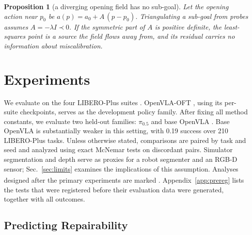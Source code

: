\documentclass{article}
\newtheorem{proposition}{Proposition}
\newcommand{\ph}{\textsuperscript{\dag}}
\begin{document}
\begin{proposition}[a diverging opening field has no sub-goal]
\label{prop:div}
Let the opening action near $p_0$ be $a(p) = a_0 + A\,(p - p_0)$. Triangulating a sub-goal from probes assumes
$A = -\lambda I \prec 0$. If the symmetric part of $A$ is positive definite, the least-squares point is a source the
field flows away from, and its residual carries no information about miscalibration.
\end{proposition}

\section{Experiments}

We evaluate on the four LIBERO-Plus suites \citep{liberoplus}. OpenVLA-OFT \citep{oft}, using its per-suite
checkpoints, serves as the development policy family. After fixing all method constants, we evaluate two held-out
families: $\pi_{0.5}$ \citep{pi05} and base OpenVLA \citep{openvla}. Base OpenVLA is substantially weaker in this
setting, with 0.19 success over 210 LIBERO-Plus tasks. Unless otherwise stated, comparisons are paired by task and seed
and analyzed using exact McNemar tests on discordant pairs. Simulator segmentation and depth serve as proxies for a
robot segmenter and an RGB-D sensor; Sec.~\ref{sec:limits} examines the implications of this assumption. Analyses
designed after the primary experiments are marked \ph. Appendix~\ref{app:prereg} lists the tests that were registered
before their evaluation data were generated, together with all outcomes.

\subsection{Predicting Repairability}

\label{sec:score}

\begin{table}[!t]
\centering\small
\caption{Policy-free prediction of which raw failures are repaired. Constants are fixed before held-out evaluation; the initial three-task test is in Appendix~\ref{app:extra}.}
\label{tab:score}
\end{table}
\end{document}
